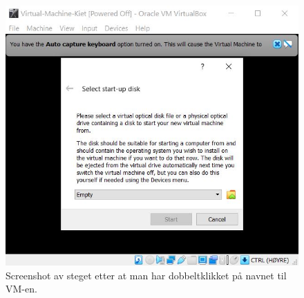 \begin{figure}[ht]
    \centering
    \includegraphics[scale = .66]{figures/VM-ISO.JPG}
    \caption{Screenshot av steget etter at man har dobbeltklikket på navnet til VM-en.}
    \label{fig:vm-ISO}
\end{figure}
